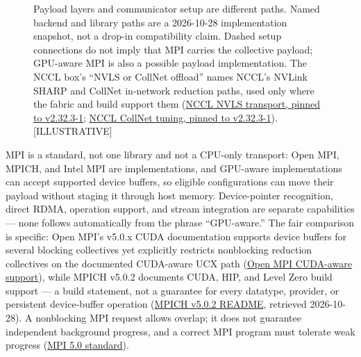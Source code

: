 \begin{figure}
\centering
{}
\caption[Payload layers and communicator setup are different paths]{Payload layers and communicator setup are different paths. Named backend and library paths are a 2026-10-28 implementation snapshot, not a drop-in compatibility claim. Dashed setup connections do not imply that MPI carries the collective payload; GPU-aware MPI is also a possible payload implementation. The NCCL box's ``NVLS or CollNet offload'' names NCCL's NVLink SHARP and CollNet in-network reduction paths, used only where the fabric and build support them (\href{https://raw.githubusercontent.com/NVIDIA/nccl/v2.32.3-1/src/transport/nvls.cc}{NCCL NVLS transport, pinned to v2.32.3-1}; \href{https://raw.githubusercontent.com/NVIDIA/nccl/v2.32.3-1/src/tuning/collnet.cc}{NCCL CollNet tuning, pinned to v2.32.3-1}). \mbox{{[}ILLUSTRATIVE{]}}}

\label{fig:9.3}\end{figure}

MPI is a standard, not one library and not a CPU-only transport: Open
MPI, MPICH, and Intel MPI are implementations, and GPU-aware
implementations can accept supported device buffers, so eligible
configurations can move their payload without staging it through host
memory. Device-pointer recognition, direct RDMA, operation support, and
stream integration are separate capabilities --- none follows
automatically from the phrase ``GPU-aware.'' The fair comparison is
specific: Open MPI's v5.0.x CUDA documentation supports device buffers
for several blocking collectives yet explicitly restricts nonblocking
reduction collectives on the documented CUDA-aware UCX path
(\href{https://docs.open-mpi.org/en/v5.0.x/tuning-apps/networking/cuda.html}{Open
MPI CUDA-aware support}), while MPICH v5.0.2 documents CUDA, HIP, and
Level Zero build support --- a build statement, not a guarantee for
every datatype, provider, or persistent device-buffer operation
(\href{https://raw.githubusercontent.com/pmodels/mpich/v5.0.2/README.md}{MPICH
v5.0.2 README}, retrieved 2026-10-28). A nonblocking MPI request allows
overlap; it does not guarantee independent background progress, and a
correct MPI program must tolerate weak progress
(\href{https://www.mpi-forum.org/docs/mpi-5.0/mpi50-report.pdf}{MPI 5.0
standard}).

